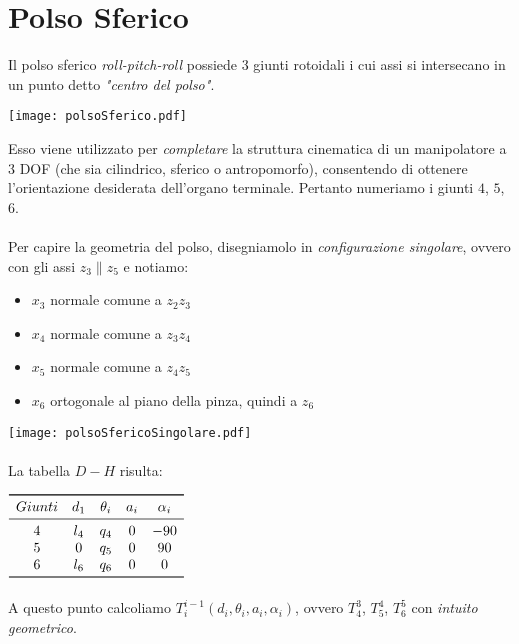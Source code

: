 \section{Polso Sferico}
Il polso sferico \emph{roll-pitch-roll} possiede 3 giunti rotoidali i cui assi si intersecano in un punto detto \emph{"centro del polso"}. 

\texttt{[image: polsoSferico.pdf]}

Esso viene utilizzato per \emph{completare} la struttura cinematica di un manipolatore a 3 DOF (che sia cilindrico, sferico o antropomorfo), consentendo di ottenere l'orientazione desiderata dell'organo terminale. Pertanto numeriamo i giunti $4$, $5$, $6$. 

\paragraph{}
Per capire la geometria del polso, disegniamolo in \emph{configurazione singolare}, ovvero con gli assi $z_3 \parallel z_5$ e notiamo:
\begin{itemize}
	\item $x_3$ normale comune a $z_2z_3$
	\item $x_4$ normale comune a $z_3z_4$
	\item $x_5$ normale comune a $z_4z_5$
	\item $x_6$ ortogonale al piano della pinza, quindi a $z_6$ 
\end{itemize}

\texttt{[image: polsoSfericoSingolare.pdf]}

\paragraph{}
La tabella $D-H$ risulta:
\begin{center}
$
\begin{array}{ccccc}
\toprule
Giunti & d_1 & \theta_i & a_i & \alpha_i \\
\midrule
4 & l_4 & q_4 & 0 & -90 \\
5 & 0 & q_5 & 0 & 90 \\
6 & l_6 & q_6 & 0 & 0 \\
\bottomrule
\end{array}
$
\end{center}

\paragraph{}
A questo punto calcoliamo $T_i^{i-1}(d_i, \theta_i, a_i, \alpha_i)$, ovvero $T_4^3$, $T_5^4$, $T_6^5$ con \emph{intuito geometrico}. 

